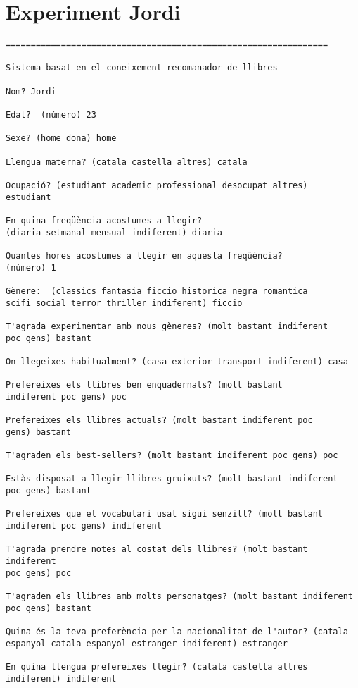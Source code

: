 \section{Experiment Jordi}
\begin{verbatim}
================================================================

Sistema basat en el coneixement recomanador de llibres

Nom? Jordi

Edat?  (número) 23

Sexe? (home dona) home

Llengua materna? (catala castella altres) catala

Ocupació? (estudiant academic professional desocupat altres)
estudiant

En quina freqüència acostumes a llegir?
(diaria setmanal mensual indiferent) diaria 

Quantes hores acostumes a llegir en aquesta freqüència?
(número) 1

Gènere:  (classics fantasia ficcio historica negra romantica
scifi social terror thriller indiferent) ficcio

T'agrada experimentar amb nous gèneres? (molt bastant indiferent
poc gens) bastant

On llegeixes habitualment? (casa exterior transport indiferent) casa

Prefereixes els llibres ben enquadernats? (molt bastant
indiferent poc gens) poc

Prefereixes els llibres actuals? (molt bastant indiferent poc
gens) bastant

T'agraden els best-sellers? (molt bastant indiferent poc gens) poc

Estàs disposat a llegir llibres gruixuts? (molt bastant indiferent
poc gens) bastant

Prefereixes que el vocabulari usat sigui senzill? (molt bastant
indiferent poc gens) indiferent

T'agrada prendre notes al costat dels llibres? (molt bastant indiferent
poc gens) poc

T'agraden els llibres amb molts personatges? (molt bastant indiferent
poc gens) bastant

Quina és la teva preferència per la nacionalitat de l'autor? (catala
espanyol catala-espanyol estranger indiferent) estranger

En quina llengua prefereixes llegir? (catala castella altres
indiferent) indiferent


\end{verbatim}
